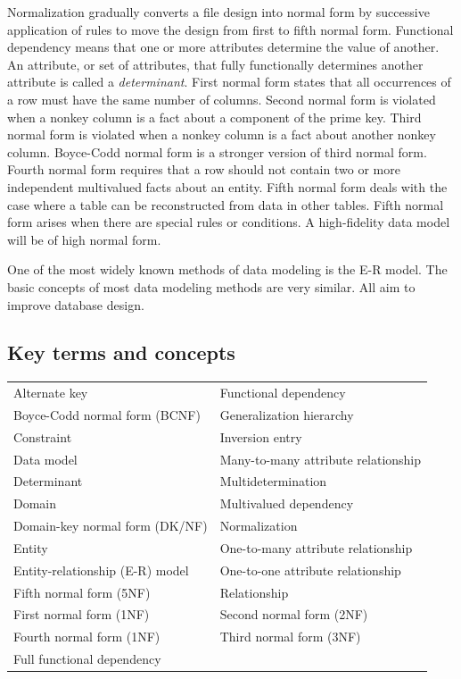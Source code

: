 \documentclass[
]{article}
\begin{document}
Normalization gradually converts a file design into normal form by
successive application of rules to move the design from first to fifth
normal form. Functional dependency means that one or more attributes
determine the value of another. An attribute, or set of attributes, that
fully functionally determines another attribute is called a
\emph{determinant}. First normal form states that all occurrences of a row
must have the same number of columns. Second normal form is violated
when a nonkey column is a fact about a component of the prime key. Third
normal form is violated when a nonkey column is a fact about another
nonkey column. Boyce-Codd normal form is a stronger version of third
normal form. Fourth normal form requires that a row should not contain
two or more independent multivalued facts about an entity. Fifth normal
form deals with the case where a table can be reconstructed from data in
other tables. Fifth normal form arises when there are special rules or
conditions. A high-fidelity data model will be of high normal form.

One of the most widely known methods of data modeling is the E-R model.
The basic concepts of most data modeling methods are very similar. All
aim to improve database design.

\hypertarget{key-terms-and-concepts-5}{%
\subsection*{Key terms and concepts}\label{key-terms-and-concepts-5}}

\begin{longtable}[]{@{}ll@{}}
\toprule
& \\
\midrule
\endhead
Alternate key & Functional dependency \\
Boyce-Codd normal form (BCNF) & Generalization hierarchy \\
Constraint & Inversion entry \\
Data model & Many-to-many attribute relationship \\
Determinant & Multidetermination \\
Domain & Multivalued dependency \\
Domain-key normal form (DK/NF) & Normalization \\
Entity & One-to-many attribute relationship \\
Entity-relationship (E-R) model & One-to-one attribute relationship \\
Fifth normal form (5NF) & Relationship \\
First normal form (1NF) & Second normal form (2NF) \\
Fourth normal form (1NF) & Third normal form (3NF) \\
Full functional dependency & \\
\bottomrule
\end{longtable}
\end{document}
